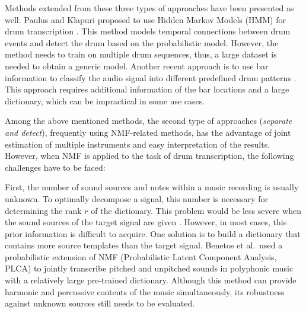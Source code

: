 \documentclass{article}
\begin{document}
Methods extended from these three types of approaches have been presented as well. Paulus and Klapuri proposed to use Hidden Markov Models (HMM) for drum transcription \cite{Paulus2009a}. This method models temporal connections between drum events and detect the drum based on the probabilistic model. However, the method needs to train on multiple drum sequences, thus, a large dataset is needed to obtain a generic model. Another recent approach is to use bar information to classify the audio signal into different predefined drum patterns \cite{Thompson2014}. This approach requires additional information of the bar locations and a large dictionary, which can be impractical in some use cases.

Among the above mentioned methods, the second type of approaches (\textit{separate and detect}), frequently using NMF-related methods, has the advantage of joint estimation of multiple instruments and easy interpretation of the results. However, when NMF is applied to the task of drum transcription, the following challenges have to be faced:

First, the number of sound sources and notes within a music recording is usually unknown. To optimally decompose a signal, this number is necessary for determining the rank $r$ of the dictionary. This problem would be less severe when the sound sources of the target signal are given \cite{Lindsay-Smith2012}. However, in most cases, this prior information is difficult to acquire. One solution is to build a dictionary that contains more source templates than the target signal. Benetos et al.\ used a probabilistic extension of NMF (Probabilistic Latent Component Analysis, PLCA) to jointly transcribe pitched and unpitched sounds in polyphonic music with a relatively large pre-trained dictionary\cite{Benetos2014}. Although this method can provide harmonic and percussive contents of the music simultaneously, its robustness against unknown sources still needs to be evaluated. %
\end{document}
